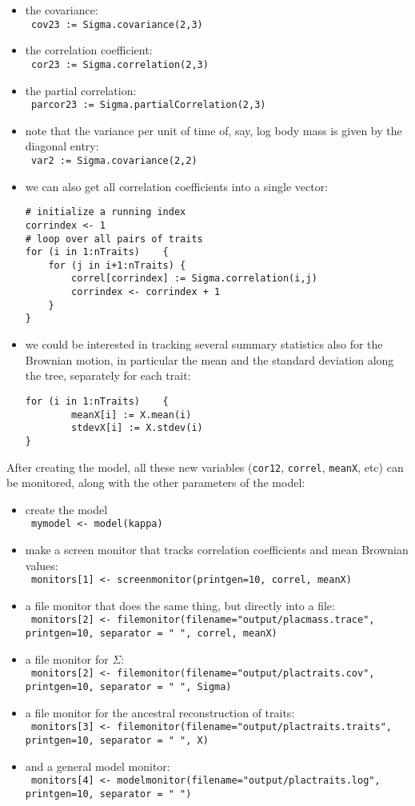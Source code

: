 \documentclass[usletter]{article}
\newcommand{\cmd}[1]{\texttt{#1}}
\begin{document}
\begin{itemize}
\item
the covariance:
\\
\cmd{
cov23 := Sigma.covariance(2,3)
}
\item
the correlation coefficient:
\\
\cmd{
cor23 := Sigma.correlation(2,3)
}
\item
the partial correlation:
\\
\cmd{
parcor23 := Sigma.partialCorrelation(2,3)
}
\item
note that the variance per unit of time of, say, log body mass is given by the diagonal entry:
\\
\cmd{
var2 := Sigma.covariance(2,2)
}
\item
we can also get all correlation coefficients into a single vector:
\begin{verbatim}
# initialize a running index
corrindex <- 1
# loop over all pairs of traits
for (i in 1:nTraits)    {
    for (j in i+1:nTraits) {
        correl[corrindex] := Sigma.correlation(i,j)
        corrindex <- corrindex + 1
    }
}
\end{verbatim}
\item
we could be interested in tracking several summary statistics also for the Brownian motion, in particular the mean and the standard deviation along the tree, separately for each trait:
\begin{verbatim}
for (i in 1:nTraits)    {
        meanX[i] := X.mean(i)
        stdevX[i] := X.stdev(i)
}
\end{verbatim}
\end{itemize}
After creating the model, all these new variables (\cmd{cor12}, \cmd{correl}, \cmd{meanX}, etc) can be monitored, along with the other parameters of the model:
\begin{itemize}
\item
create the model
\\
\cmd{
mymodel <- model(kappa)
}
\item
make a screen monitor that tracks correlation coefficients and mean Brownian values:
\\
\cmd{
monitors[1] <- screenmonitor(printgen=10, correl, meanX)
}
\item
a file monitor that does the same thing, but directly into a file:
\\
\cmd{
monitors[2] <- filemonitor(filename="output/placmass.trace", printgen=10, separator = "       ", correl, meanX)
}
\item
a file monitor for $\Sigma$:
\\
\cmd{
monitors[2] <- filemonitor(filename="output/plactraits.cov", printgen=10, separator = "  ", Sigma)
}
\item
a file monitor for the ancestral reconstruction of traits:
\\
\cmd{
monitors[3] <- filemonitor(filename="output/plactraits.traits", printgen=10, separator = "       ", X)
}
\item
and a general model monitor:
\\
\cmd{
monitors[4] <- modelmonitor(filename="output/plactraits.log", printgen=10, separator = " ")
}
\end{itemize}
\end{document}
